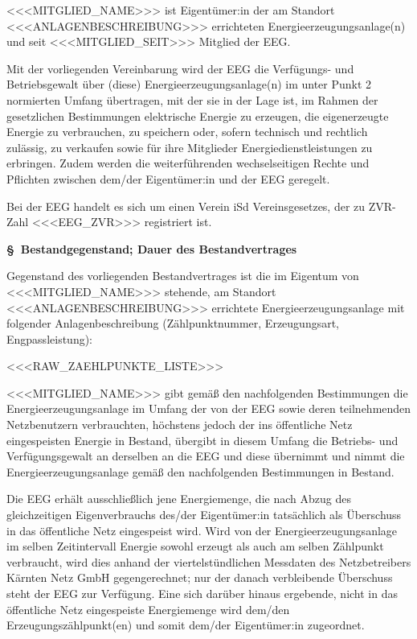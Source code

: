 \documentclass[a4paper,11pt]{article}
\newcounter{parasec}
\newcounter{parasubsec}[parasec]
\newcommand{\parasec}[1]{%
  \stepcounter{parasec}%
  \setcounter{parasubsec}{0}%
  \par\Needspace*{5\baselineskip}%
  \bigskip
  {\large\bfseries\color{tuerkis}\S\ \theparasec\quad #1}\par\nopagebreak
  \smallskip\nopagebreak
}
\begin{document}
<<<MITGLIED_NAME>>> ist Eigentümer:in der am Standort <<<ANLAGENBESCHREIBUNG>>> errichteten Energieerzeugungsanlage(n) und seit <<<MITGLIED_SEIT>>> Mitglied der EEG.

Mit der vorliegenden Vereinbarung wird der EEG die Verfügungs- und Betriebsgewalt über (diese) Energieerzeugungsanlage(n) im unter Punkt 2 normierten Umfang übertragen, mit der sie in der Lage ist, im Rahmen der gesetzlichen Bestimmungen elektrische Energie zu erzeugen, die eigenerzeugte Energie zu verbrauchen, zu speichern oder, sofern technisch und rechtlich zulässig, zu verkaufen sowie für ihre Mitglieder Energiedienstleistungen zu erbringen. Zudem werden die weiterführenden wechselseitigen Rechte und Pflichten zwischen dem/der Eigentümer:in und der EEG geregelt.

Bei der EEG handelt es sich um einen Verein iSd Vereinsgesetzes, der zu ZVR-Zahl <<<EEG_ZVR>>> registriert ist.

\parasec{Bestandgegenstand; Dauer des Bestandvertrages}

Gegenstand des vorliegenden Bestandvertrages ist die im Eigentum von <<<MITGLIED_NAME>>> stehende, am Standort <<<ANLAGENBESCHREIBUNG>>> errichtete Energieerzeugungsanlage mit folgender Anlagenbeschreibung (Zählpunktnummer, Erzeugungsart, Engpassleistung):

\medskip
\begin{itemize}
<<<RAW_ZAEHLPUNKTE_LISTE>>>
\end{itemize}
\medskip

<<<MITGLIED_NAME>>> gibt gemäß den nachfolgenden Bestimmungen die Energieerzeugungsanlage im Umfang der von der EEG sowie deren teilnehmenden Netzbenutzern verbrauchten, höchstens jedoch der ins öffentliche Netz eingespeisten Energie in Bestand, übergibt in diesem Umfang die Betriebs- und Verfügungsgewalt an derselben an die EEG und diese übernimmt und nimmt die Energieerzeugungsanlage gemäß den nachfolgenden Bestimmungen in Bestand.

Die EEG erhält ausschließlich jene Energiemenge, die nach Abzug des gleichzeitigen Eigenverbrauchs des/der Eigentümer:in tatsächlich als Überschuss in das öffentliche Netz eingespeist wird. Wird von der Energieerzeugungsanlage im selben Zeitintervall Energie sowohl erzeugt als auch am selben Zählpunkt verbraucht, wird dies anhand der viertelstündlichen Messdaten des Netzbetreibers Kärnten Netz GmbH gegengerechnet; nur der danach verbleibende Überschuss steht der EEG zur Verfügung. Eine sich darüber hinaus ergebende, nicht in das öffentliche Netz eingespeiste Energiemenge wird dem/den Erzeugungszählpunkt(en) und somit dem/der Eigentümer:in zugeordnet.
\end{document}
